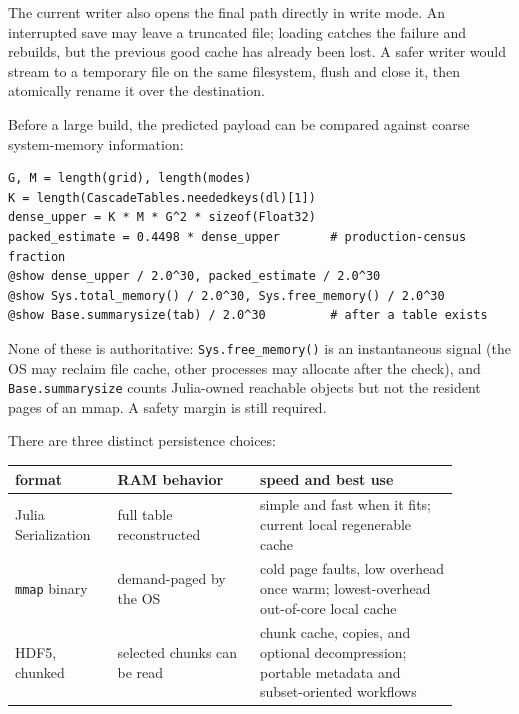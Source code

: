 \documentclass[11pt]{article}
\begin{document}
The current writer also opens the final path directly in write mode.  An
interrupted save may leave a truncated file; loading catches the failure and
rebuilds, but the previous good cache has already been lost.  A safer writer
would stream to a temporary file on the same filesystem, flush and close it,
then atomically rename it over the destination.

\begin{samepage}
Before a large build, the predicted payload can be compared against coarse
system-memory information:
\begin{verbatim}
G, M = length(grid), length(modes)
K = length(CascadeTables.neededkeys(dl)[1])
dense_upper = K * M * G^2 * sizeof(Float32)
packed_estimate = 0.4498 * dense_upper       # production-census fraction
@show dense_upper / 2.0^30, packed_estimate / 2.0^30
@show Sys.total_memory() / 2.0^30, Sys.free_memory() / 2.0^30
@show Base.summarysize(tab) / 2.0^30         # after a table exists
\end{verbatim}
\end{samepage}
None of these is authoritative: \texttt{Sys.free\_memory()} is an
instantaneous signal (the OS may reclaim file cache, other processes may
allocate after the check), and \texttt{Base.summarysize} counts Julia-owned
reachable objects but not the resident pages of an mmap.  A safety margin is
still required.

There are three distinct persistence choices:
\begin{center}
\begin{tabular}{p{0.20\linewidth}p{0.29\linewidth}p{0.39\linewidth}}
\hline
format & RAM behavior & speed and best use\\
\hline
Julia Serialization
& full table reconstructed
& simple and fast when it fits; current local regenerable cache\\
\texttt{mmap} binary
& demand-paged by the OS
& cold page faults, low overhead once warm; lowest-overhead out-of-core
local cache\\
HDF5, chunked
& selected chunks can be read
& chunk cache, copies, and optional decompression; portable metadata and
subset-oriented workflows\\
\hline
\end{tabular}
\end{center}
\end{document}
